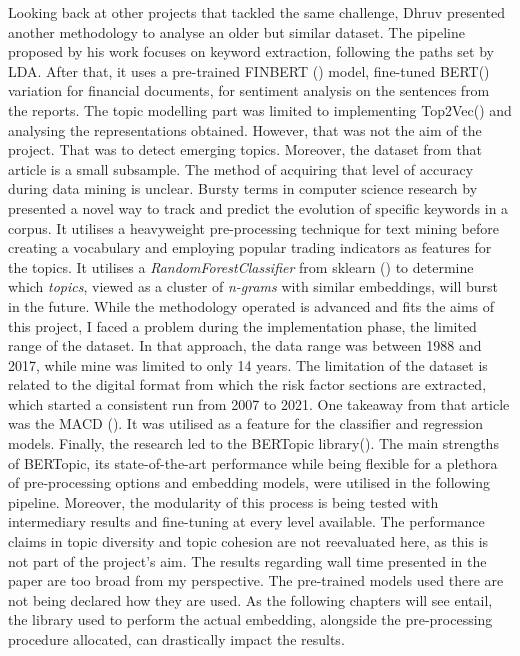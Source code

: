\documentclass[12pt,MSc,a4paper,oneside]{muthesis}
\begin{document}
Looking back at other projects that tackled the same challenge, Dhruv \cite{dhruv}  presented another methodology to analyse an older but similar dataset. The pipeline proposed by his work focuses on keyword extraction, following the paths set by LDA. After that, it uses a pre-trained FINBERT (\cite{DBLP:journals/corr/abs-1908-10063}) model, fine-tuned BERT(\cite{DBLP:journals/corr/abs-1810-04805}) variation for financial documents, for sentiment analysis on the sentences from the reports. The topic modelling part was limited to implementing Top2Vec(\cite{top2vec}) and analysing the representations obtained. However, that was not the aim of the project. That was to detect emerging topics. Moreover, the dataset from that article is a small subsample. The method of acquiring that level of accuracy during data mining is unclear.
Bursty terms in computer science research by \cite{Tattershall2019DetectingBT} presented a novel way to track and predict the evolution of specific keywords in a corpus. It utilises a heavyweight pre-processing technique for text mining before creating a vocabulary and employing popular trading indicators as features for the topics. It utilises a \textit{RandomForestClassifier} from sklearn (\cite{scikit-learn}) to determine which \textit{topics}, viewed as a cluster of \textit{n-grams} with similar embeddings, will burst in the future. While the methodology operated is advanced and fits the aims of this project, I faced a problem during the implementation phase, the limited range of the dataset. In that approach, the data range was between 1988 and 2017, while mine was limited to only 14 years. The limitation of the dataset is related to the digital format from which the risk factor sections are extracted, which started a consistent run from 2007 to 2021.
One takeaway from that article was the MACD (\cite{wang2018predicting}). It was utilised as a feature for the classifier and regression models.
Finally, the research led to the BERTopic library(\cite{grootendorst2020bertopic}). The main strengths of BERTopic, its state-of-the-art performance while being flexible for a plethora of pre-processing options and embedding models, were utilised in the following pipeline.
Moreover, the modularity of this process is being tested with intermediary results and fine-tuning at every level available. The performance claims in topic diversity and topic cohesion are not reevaluated here, as this is not part of the project's aim. The results regarding wall time presented in the paper are too broad from my perspective. The pre-trained models used there are not being declared how they are used. As the following chapters will see entail, the library used to perform the actual embedding, alongside the pre-processing procedure allocated, can drastically impact the results.
\end{document}
